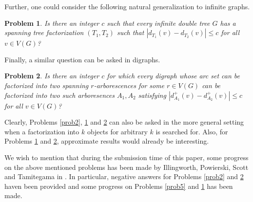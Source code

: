 \documentclass{article}
\theoremstyle{plain}
\newtheorem{Problem}{Problem}
\theoremstyle{nonumberplain}
\theoremstyle{nonumberplain}
\newcommand{\stf}{spanning tree factorization }
\begin{document}
Further, one could consider the following natural generalization to infinite graphs.

\begin{Problem}\label{prob3}
Is there an integer $c$ such that every infinite double tree $G$ has a \stf $(T_1,T_2)$ such that $|d_{T_1}(v)-d_{T_2}(v)|\leq c$ for all $v \in V(G)$?
\end{Problem}

Finally, a similar question can be asked in digraphs.

\begin{Problem}\label{prob4}
Is there an integer $c$ for which every digraph whose arc set can be factorized into two spanning $r$-arborescences for some $r \in V(G)$ can be factorized into two such arboresences $A_1,A_2$ satisfying $|d_{A_1}^+(v)-d_{A_2}^+(v)|\leq c$ for all $v \in V(G)$?
\end{Problem}
Clearly, Problems \ref{prob2}, \ref{prob3} and \ref{prob4} can also be asked in the more general setting when a factorization into $k$ objects for arbitrary $k$ is searched for. Also, for Problems \ref{prob3} and \ref{prob4}, approximate results would already be interesting. 
\medskip

We wish to mention that during the submission time of this paper, some progress on the above mentioned problems has been made by Illingworth, Powierski, Scott and Tamitegama in \cite{ipst}. In particular, negative answers for Problems \ref{prob2} and \ref{prob4} haven been provided and some progress on Problems \ref{prob5} and \ref{prob3} has been made.
\end{document}
